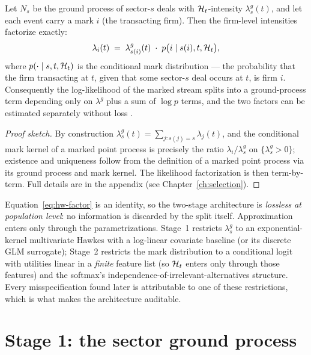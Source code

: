 \begin{theorem}
\label{thm:hw-factor}
Let $N_s$ be the ground process of sector-$s$ deals with $\mathcal{H}_t$-intensity
$\lambda^{g}_{s}(t)$, and let each event carry a mark $i$ (the transacting firm). Then the
firm-level intensities factorize exactly:
\begin{equation}
\label{eq:hw-factor}
\lambda_i(t) \;=\; \lambda^{g}_{s(i)}(t)\; \cdot\; p\bigl(i \mid s(i), t, \mathcal{H}_t\bigr),
\end{equation}
where $p(\cdot \mid s, t, \mathcal{H}_t)$ is the conditional mark distribution --- the
probability that the firm transacting at $t$, given that some sector-$s$ deal occurs at
$t$, is firm $i$. Consequently the log-likelihood of the marked stream splits into a
ground-process term depending only on $\lambda^g$ plus a sum of $\log p$ terms, and the
two factors can be estimated separately without loss \cite{daley2003}.
\end{theorem}

\begin{proof}[Proof sketch]
By construction $\lambda^g_s(t) = \sum_{j: s(j)=s} \lambda_j(t)$, and the conditional mark
kernel of a marked point process is precisely the ratio $\lambda_i / \lambda^g_{s}$ on
$\{\lambda^g_s > 0\}$; existence and uniqueness follow from the definition of a marked
point process via its ground process and mark kernel. The likelihood factorization is then
term-by-term. Full details are in the appendix (see Chapter~\ref{ch:selection}).
\end{proof}

\begin{remark}
\label{rem:hw-lossless}
Equation~\eqref{eq:hw-factor} is an identity, so the two-stage architecture is
\emph{lossless at population level}: no information is discarded by the split itself.
Approximation enters only through the parametrizations. Stage~1 restricts $\lambda^g_s$
to an exponential-kernel multivariate Hawkes with a log-linear covariate baseline (or its
discrete GLM surrogate); Stage~2 restricts the mark distribution to a conditional logit
with utilities linear in a \emph{finite} feature list (so $\mathcal{H}_t$ enters only through
those features) and the softmax's independence-of-irrelevant-alternatives structure.
Every misspecification found later is attributable to one of these restrictions, which is
what makes the architecture auditable.
\end{remark}

\section{Stage 1: the sector ground process}
\label{sec:hw-stage1}

